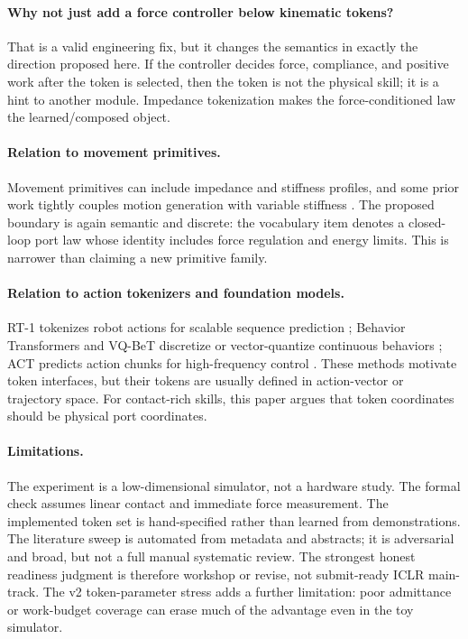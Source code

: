 \documentclass{article}
\begin{document}
\paragraph{Why not just add a force controller below kinematic tokens?}
That is a valid engineering fix, but it changes the semantics in exactly the direction proposed here. If the controller decides force, compliance, and positive work after the token is selected, then the token is not the physical skill; it is a hint to another module. Impedance tokenization makes the force-conditioned law the learned/composed object.

\paragraph{Relation to movement primitives.}
Movement primitives can include impedance and stiffness profiles, and some prior work tightly couples motion generation with variable stiffness \citep{khansari2014statevarying}. The proposed boundary is again semantic and discrete: the vocabulary item denotes a closed-loop port law whose identity includes force regulation and energy limits. This is narrower than claiming a new primitive family.

\paragraph{Relation to action tokenizers and foundation models.}
RT-1 tokenizes robot actions for scalable sequence prediction \citep{brohan2023rt1}; Behavior Transformers and VQ-BeT discretize or vector-quantize continuous behaviors \citep{shafiullah2022bet,lee2024vqbet}; ACT predicts action chunks for high-frequency control \citep{zhao2023act}. These methods motivate token interfaces, but their tokens are usually defined in action-vector or trajectory space. For contact-rich skills, this paper argues that token coordinates should be physical port coordinates.

\paragraph{Limitations.}
The experiment is a low-dimensional simulator, not a hardware study. The formal check assumes linear contact and immediate force measurement. The implemented token set is hand-specified rather than learned from demonstrations. The literature sweep is automated from metadata and abstracts; it is adversarial and broad, but not a full manual systematic review. The strongest honest readiness judgment is therefore workshop or revise, not submit-ready ICLR main-track.
The v2 token-parameter stress adds a further limitation: poor admittance or work-budget
coverage can erase much of the advantage even in the toy simulator.
\end{document}
